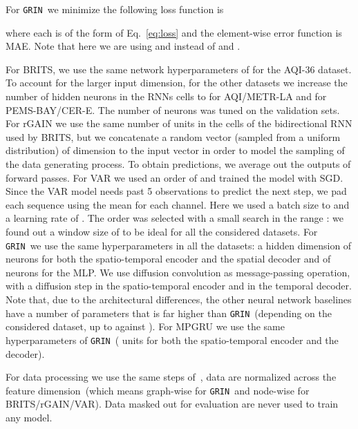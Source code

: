 \documentclass{article} \usepackage{iclr2022_conference,times}
\newcommand{\GRIL}{\texttt{GRIN}}
\begin{document}
For \GRIL\ we minimize the following loss function is

where each  is of the form of Eq.~\ref{eq:loss} and the element-wise error function is MAE. Note that here we are using  and  instead of  and .

For BRITS, we use the same network hyperparameters of \citet{cao2018brits} for the AQI-36 dataset. To account for the larger input dimension, for the other datasets we increase the number of hidden neurons in the RNNs cells to  for AQI/METR-LA and  for PEMS-BAY/CER-E. The number of neurons was tuned on the validation sets.
For rGAIN we use the same number of units in the cells of the bidirectional RNN used by BRITS, but we concatenate a random vector (sampled from a uniform distribution) of dimension  to the input vector in order to model the sampling of the data generating process. To obtain predictions, we average out the outputs of  forward passes.
For VAR we used an order of  and trained the model with SGD. Since the VAR model needs past 5 observations to predict the next step, we pad each sequence using the mean for each channel.  Here we used a batch size to  and a learning rate of . The order was selected with a small search in the range : we found out a window size of  to be ideal for all the considered datasets.
For \GRIL\ we use the same hyperparameters in all the datasets: a hidden dimension of  neurons for both the spatio-temporal encoder and the spatial decoder and of  neurons for the MLP. We use diffusion convolution as message-passing operation, with a diffusion step  in the spatio-temporal encoder and  in the temporal decoder. Note that, due to the architectural differences, the other neural network baselines have a number of parameters that is far higher than \GRIL\ (depending on the considered dataset, up to  against ). 
For MPGRU we use the same hyperparameters of \GRIL~( units for both the spatio-temporal encoder and the decoder).

For data processing we use the same steps of~\citet{li2018diffusion}, data are normalized across the feature dimension~(which means graph-wise for \GRIL\  and node-wise for BRITS/rGAIN/VAR). Data masked out for evaluation are never used to train any model.
\end{document}
